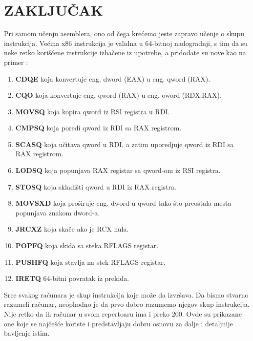 \documentclass[a4paper]{article}
\begin{document}
\section{\textbf{ZAKLJU\v CAK}}

Pri samom u\v cenju asemblera, ono od \v cega kre\' cemo jeste zapravo u\v cenje o skupu instrukcija. 
Ve\' cina x86 instrukcija je validna u 64-bitnoj nadogradnji, s tim da su neke retko kori\v s\' cene 
instrukcije izba\v cene iz upotrebe, a pridodate su nove kao na primer \cite{Wikipedia2}: \\
\begin{enumerate}
\item{\textbf{CDQE}} koja konvertuje eng. dword (EAX) u eng. qword (RAX).
\item{\textbf{CQO}} koja konvertuje eng. qword (RAX) u eng. oword (RDX:RAX).
\item{\textbf{MOVSQ}} koja kopira qword iz RSI registra u RDI.
\item{\textbf{CMPSQ}} koja poredi qword iz RDI sa RAX registrom.
\item{\textbf{SCASQ}} koja u\v citava qword u RDI, a zatim uporedjuje qword iz RDI sa RAX registrom.
\item{\textbf{LODSQ}} koja popunjava RAX registar sa qword-om iz RSI registra.
\item{\textbf{STOSQ}} koja skladi\v sti qword u RDI iz RAX registra.
\item{\textbf{MOVSXD}} koja pro\v siruje eng. dword u qword tako \v sto preostala mesta popunjava znakom dword-a.
\item{\textbf{JRCXZ}} koja ska\v ce ako je RCX nula.
\item{\textbf{POPFQ}} koja skida sa steka RFLAGS registar.
\item{\textbf{PUSHFQ}} koja stavlja na stek RFLAGS registar.
\item{\textbf{IRETQ	}} 64-bitni povratak iz prekida.	
\end{enumerate}

Srce svakog ra\v cunara je skup instrukcija koje mo\v ze da izvr\v sava. 
Da bismo stvarno razumeli ra\v cunar, neophodno je da prvo dobro razumemo njegov skup instrukcija.
Nije retko da ih ra\v cunar u svom repertoaru ima i preko 200. Ovde su prikazane one koje se naj\v ce\v s\' ce koriste 
i predstavljaju dobru osnovu za dalje i detaljnije bavljenje istim.

\newpage
{}
\appendix
 

\end{document}
